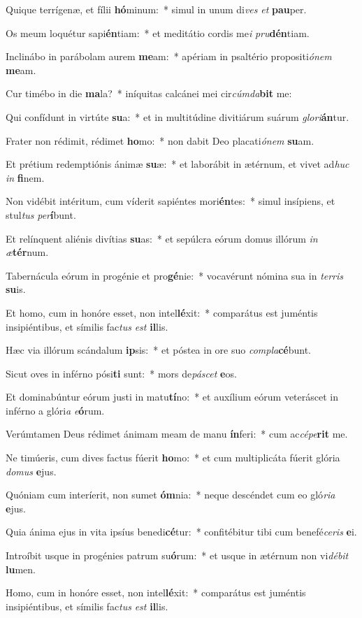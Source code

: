 \item Quique terrígenæ, et fílii \textbf{hó}minum:~* simul in unum di\textit{ves} \textit{et} \textbf{pau}per.
\item Os meum loquétur sapi\textbf{én}tiam:~* et meditátio cordis me\textit{i} \textit{pru}\textbf{dén}tiam.
\item Inclinábo in parábolam aurem \textbf{me}am:~* apériam in psaltério propositi\textit{ó}\textit{nem} \textbf{me}am.
\item Cur timébo in die \textbf{ma}la?~* iníquitas calcánei mei cir\textit{cúm}\textit{da}\textbf{bit} me:
\item Qui confídunt in virtúte \textbf{su}a:~* et in multitúdine divitiárum suárum \textit{glo}\textit{ri}\textbf{án}tur.
\item Frater non rédimit, rédimet \textbf{ho}mo:~* non dabit Deo placati\textit{ó}\textit{nem} \textbf{su}am.
\item Et prétium redemptiónis ánimæ \textbf{su}æ:~* et laborábit in ætérnum, et vivet ad\textit{huc} \textit{in} \textbf{fi}nem.
\item Non vidébit intéritum, cum víderit sapiéntes mori\textbf{én}tes:~* simul insípiens, et stul\textit{tus} \textit{per}\textbf{í}bunt.
\item Et relínquent aliénis divítias \textbf{su}as:~* et sepúlcra eórum domus illórum \textit{in} \textit{æ}\textbf{tér}num.
\item Tabernácula eórum in progénie et pro\textbf{gé}nie:~* vocavérunt nómina sua in \textit{ter}\textit{ris} \textbf{su}is.
\item Et homo, cum in honóre esset, non intel\textbf{lé}xit:~* comparátus est juméntis insipiéntibus, et símilis fac\textit{tus} \textit{est} \textbf{il}lis.
\item Hæc via illórum scándalum \textbf{ip}sis:~* et póstea in ore suo \textit{com}\textit{pla}\textbf{cé}bunt.
\item Sicut oves in inférno pósi\textbf{ti} sunt:~* mors de\textit{pá}\textit{scet} \textbf{e}os.
\item Et dominabúntur eórum justi in matu\textbf{tí}no:~* et auxílium eórum veteráscet in inférno a glóri\textit{a} \textit{e}\textbf{ó}rum.
\item Verúmtamen Deus rédimet ánimam meam de manu \textbf{ín}feri:~* cum ac\textit{cé}\textit{pe}\textbf{rit} me.
\item Ne timúeris, cum dives factus fúerit \textbf{ho}mo:~* et cum multiplicáta fúerit glória \textit{do}\textit{mus} \textbf{e}jus.
\item Quóniam cum interíerit, non sumet \textbf{óm}nia:~* neque descéndet cum eo gló\textit{ri}\textit{a} \textbf{e}jus.
\item Quia ánima ejus in vita ipsíus benedi\textbf{cé}tur:~* confitébitur tibi cum benefé\textit{ce}\textit{ris} \textbf{e}i.
\item Introíbit usque in progénies patrum su\textbf{ó}rum:~* et usque in ætérnum non vi\textit{dé}\textit{bit} \textbf{lu}men.
\item Homo, cum in honóre esset, non intel\textbf{lé}xit:~* comparátus est juméntis insipiéntibus, et símilis fac\textit{tus} \textit{est} \textbf{il}lis.
